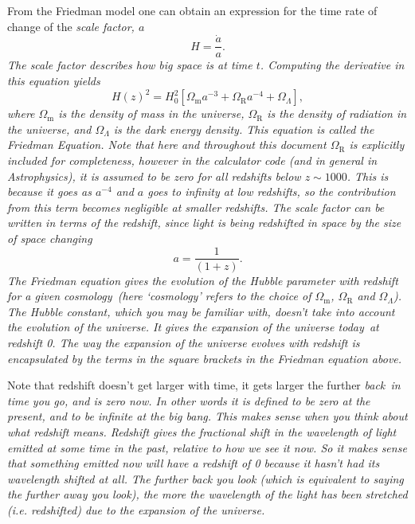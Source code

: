 \documentclass[]{article}
\begin{document}
\noindent From the Friedman model one can obtain an expression for the time rate of change of the \itshape scale factor\upshape, $a$
\begin{equation}
H = \frac{\dot a}{a}.
\end{equation}
The scale factor describes how big space is at time $t$. Computing the derivative in this equation yields
\begin{equation}
H(z)^2 = H_0^2[\Omega_\mathrm{m} a^{-3}+\Omega_\mathrm{R} a^{-4}+\Omega_\Lambda],
\end{equation}
\noindent where $\Omega_\mathrm{m}$ is the density of mass in the universe, $\Omega_\mathrm{R}$ is the density of radiation in the universe, and $\Omega_\Lambda$ is the dark energy density. This equation is called the Friedman Equation. Note that here and throughout this document $\Omega_\mathrm{R}$ is explicitly included for completeness, however in the calculator code (and in general in Astrophysics), it is assumed to be zero for all redshifts below $z\sim1000$. This is because it goes as $a^{-4}$ and $a$ goes to infinity at low redshifts, so the contribution from this term becomes negligible at smaller redshifts. The scale factor can be written in terms of the redshift, since light is being redshifted in space by the size of space changing
\begin{equation}
a = \frac{1}{(1+z)}.
\end{equation}
The Friedman equation gives the evolution of the Hubble parameter with redshift for a given \itshape cosmology~\upshape (here ‘cosmology’ refers to the choice of $\Omega_\mathrm{m}$, $\Omega_\mathrm{R}$ and $\Omega_\Lambda$). The Hubble \itshape constant\upshape , which you may be familiar with, doesn't take into account the evolution of the universe. It gives the expansion of the universe \itshape today~\upshape at redshift 0. The way the expansion of the universe evolves with redshift is encapsulated by the terms in the square brackets in the Friedman equation above. 

\noindent Note that redshift doesn't get larger with time, it gets larger the further \itshape back~\upshape in time you go, and is zero now. In other words it is defined to be zero at the present, and to be infinite at the big bang. This makes sense when you think about what redshift means. Redshift gives the fractional shift in the wavelength of light emitted at some time in the past, relative to how we see it now. So it makes sense that something emitted now will have a redshift of 0 because it hasn't had its wavelength shifted at all. The further back you look (which is equivalent to saying the further away you look), the more the wavelength of the light has been stretched (i.e. redshifted) due to the expansion of the universe. \\
\end{document}
